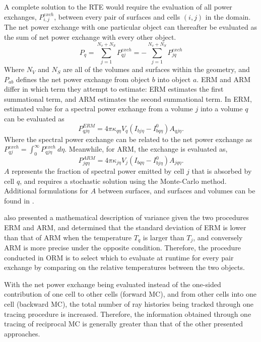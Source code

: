 A complete solution to the RTE would require the evaluation of all power exchanges, $P_{i,j}^{exch}$, between every pair of surfaces and cells $(i,j)$ in the domain.
The net power exchange with one particular object can thereafter be evaluated as the sum of net power exchange with every other object.
\begin{equation}
    P_q=\sum_{j=1}^{N_v+N_S}P_{qj}^{exch}=-\sum_{j=1}^{N_v+N_S}P_{jq}^{exch}
    \label{eq:power_exchange}
\end{equation}
Where $N_V$ and $N_S$ are all of the volumes and surfaces within the geometry, and
$P_{ab}$ defines the net power exchange from object $b$ into object $a$.
ERM and ARM differ in which term they attempt to estimate: ERM estimates the first summational term, and ARM estimates the second summational term.
In ERM, estimated value for a spectral power exchange from a volume $j$ into a volume $q$ can be evaluated as
\begin{equation}
    P_{qj\eta}^{ERM}=4\pi{}\kappa_{q\eta}V_q(I_{bj\eta}-I^0_{bq\eta})A_{qj\eta}.
    \label{eq:fraction_spectralpower_ERM}
\end{equation}
Where the spectral power exchange can be related to the net power exchange as $P_{qj}^{exch}=\int_0^\infty{}P_{qj\eta}^{exch}~d\eta$.
Meanwhile, for ARM, the exchange is evaluated as,
\begin{equation}
    P_{jq\eta}^{ARM}=4\pi{}\kappa_{j\eta}V_j(I_{bq\eta}-I^0_{bj\eta})A_{jq\eta}.
    \label{eq:power_exchange_ARM}
\end{equation}
$A$ represents the fraction of spectral power emitted by cell $j$ that is absorbed by cell $q$, and requires a stochastic solution using the Monte-Carlo method. Additional formulations for $A$ between surfaces, and surfaces and volumes can be found in \citet{Dupoirieux2006AnThicknesses}.

\citet{Dupoirieux2006AnThicknesses} also presented a mathematical description of variance given the two procedures ERM and ARM, and determined that the standard deviation of ERM is lower than that of ARM when the temperature $T_q$ is larger than $T_j$, and conversely ARM is more precise under the opposite condition.
Therefore, the procedure conducted in ORM is to select which to evaluate at runtime for every pair exchange by comparing on the relative temperatures between the two objects.

With the net power exchange being evaluated instead of the one-sided contribution of one cell to other cells (forward MC), and from other cells into one cell (backward MC), the total number of ray histories being tracked through one tracing procedure is increased.
Therefore, the information obtained through one tracing of reciprocal MC is generally greater than that of the other presented approaches.

